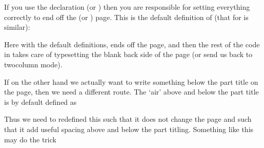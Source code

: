    If you use the declaration \cmd{\nopartblankpage} (or \cmd{\nobookblankpage})
then you are responsible for setting everything correctly to end off the
\cmd{\part} (or \cmd{\book}) page. This is the default definition of
\cmd{\partpageend} (that for \cmd{\bookpageend} is similar):
\begin{lcode}
\newcommand{\partpageend}{%
  \afterpartskip
  \ifm@mnopartnewpage%
  \else%
    \if@twoside
      \if@openright%
        \null
        \thispagestyle{afterpart}%
        \newpage
      \fi
    \fi
  \fi
  \if@tempswa%
    \twocolumn
  \fi}
\end{lcode}
Here with the default definitions, \cmd{\afterpartskip} ends off the
\cmd{\part} page, and then the rest of the code in \cmd{\partpageend}
takes care of typesetting the blank back side of the \cmd{\part} page
(or send us back to twocolumn mode).

If on the other hand we actually want to write something below the
part title on the \cmd{\part} page, then we need a different
route. The `air' above and below the part title is by default defined as
\begin{lcode}
  \newcommand*{\beforepartskip}{\null\vfil}
  \newcommand*{\afterpartskip}{\vfil\newpage}
\end{lcode}
Thus we need to redefined this such that it does not change the page
and such that it add useful spacing above and below the part
titling. Something like this may do the trick
\begin{lcode}
\makeatletter
  \newcommand*{\beforepartskip}{\null\vskip4cm}
  \newcommand*{\afterpartskip}{\par\vskip1cm%
    \@afterindentfalse\@afterheading}
\makeatother
\end{lcode}



